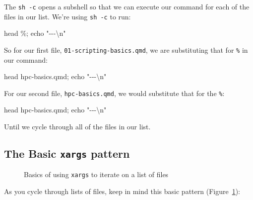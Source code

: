 \documentclass[
  letterpaper,
  DIV=11,
  numbers=noendperiod]{scrreprt}
\newenvironment{Shaded}{\begin{snugshade}}{\end{snugshade}}
\newcommand{\StringTok}[1]{\textcolor[rgb]{0.13,0.47,0.30}{#1}}
\begin{document}
The \texttt{sh\ -c} opens a subshell so that we can execute our command
for each of the files in our list. We're using \texttt{sh\ -c} to run:

\begin{Shaded}
\begin{Highlighting}[]
\StringTok{\textquotesingle{}head \%; echo "{-}{-}{-}\textbackslash{}n"\textquotesingle{}}
\end{Highlighting}
\end{Shaded}

So for our first file, \texttt{01-scripting-basics.qmd}, we are
substituting that for \texttt{\%} in our command:

\begin{Shaded}
\begin{Highlighting}[]
\StringTok{\textquotesingle{}head hpc{-}basics.qmd; echo "{-}{-}{-}\textbackslash{}n"\textquotesingle{}}
\end{Highlighting}
\end{Shaded}

For our second file, \texttt{hpc-basics.qmd}, we would substitute that
for the \texttt{\%}:

\begin{Shaded}
\begin{Highlighting}[]
\StringTok{\textquotesingle{}head hpc{-}basics.qmd; echo "{-}{-}{-}\textbackslash{}n"\textquotesingle{}}
\end{Highlighting}
\end{Shaded}

Until we cycle through all of the files in our list.

\subsection{\texorpdfstring{The Basic \texttt{xargs}
pattern}{The Basic xargs pattern}}\label{the-basic-xargs-pattern}

\begin{figure}


\caption{\label{fig-xargs}Basics of using \texttt{xargs} to iterate on a
list of files}

\end{figure}%

As you cycle through lists of files, keep in mind this basic pattern
(Figure~\ref{fig-xargs}):
\end{document}
